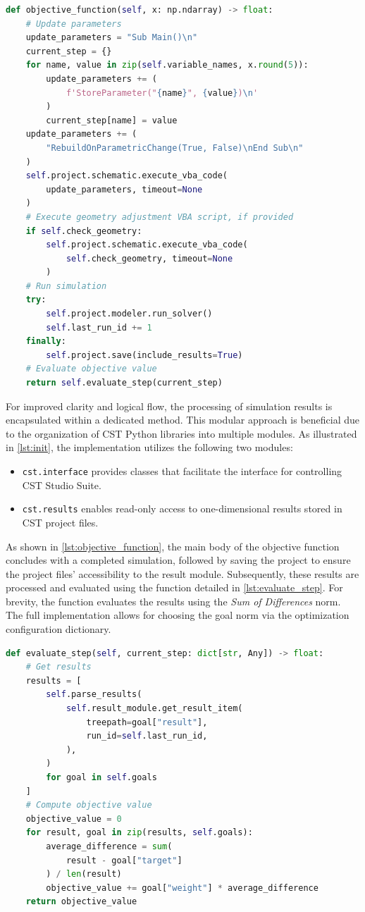 \documentclass[11pt,a4paper,twoside,openany]{report}
\begin{document}
\begin{lstlisting}[caption={Objective function}, label={lst:objective_function}, language=Python]
def objective_function(self, x: np.ndarray) -> float:
    # Update parameters
    update_parameters = "Sub Main()\n"
    current_step = {}
    for name, value in zip(self.variable_names, x.round(5)):
        update_parameters += (
            f'StoreParameter("{name}", {value})\n'
        )
        current_step[name] = value
    update_parameters += (
        "RebuildOnParametricChange(True, False)\nEnd Sub\n"
    )
    self.project.schematic.execute_vba_code(
        update_parameters, timeout=None
    )
    # Execute geometry adjustment VBA script, if provided
    if self.check_geometry:
        self.project.schematic.execute_vba_code(
            self.check_geometry, timeout=None
        )
    # Run simulation
    try:
        self.project.modeler.run_solver()
        self.last_run_id += 1
    finally:
        self.project.save(include_results=True)
    # Evaluate objective value
    return self.evaluate_step(current_step)
\end{lstlisting}

For improved clarity and logical flow, the processing of simulation results is encapsulated within a dedicated method. This modular approach is beneficial due to the organization of CST Python libraries into multiple modules. As illustrated in \cref{lst:init}, the implementation utilizes the following two modules:
\begin{itemize}
    \item \texttt{cst.interface} provides classes that facilitate the interface for controlling CST Studio Suite.
    \item \texttt{cst.results} enables read-only access to one-dimensional results stored in CST project files.
\end{itemize}
As shown in \cref{lst:objective_function}, the main body of the objective function concludes with a completed simulation, followed by saving the project to ensure the project files' accessibility to the result module. Subsequently, these results are processed and evaluated using the function detailed in \cref{lst:evaluate_step}. For brevity, the function evaluates the results using the \emph{Sum of Differences} norm. The full implementation allows for choosing the goal norm 
via the optimization configuration dictionary.

\begin{lstlisting}[caption={Optimization step evaluation}, label={lst:evaluate_step}, language=Python]
def evaluate_step(self, current_step: dict[str, Any]) -> float:
    # Get results
    results = [
        self.parse_results(
            self.result_module.get_result_item(
                treepath=goal["result"],
                run_id=self.last_run_id,
            ),
        )
        for goal in self.goals
    ]
    # Compute objective value
    objective_value = 0
    for result, goal in zip(results, self.goals):
        average_difference = sum(
            result - goal["target"]
        ) / len(result)
        objective_value += goal["weight"] * average_difference
    return objective_value
\end{lstlisting}
\end{document}

